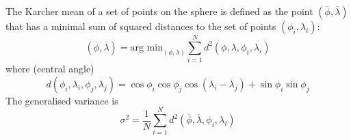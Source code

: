 \documentclass{article}
\begin{document}
The Karcher mean of a set of points on the sphere
\citep{Karc77riem,HeoSmal06form} is defined as the point
$(\overline{\phi}, \overline{\lambda})$ that has a minimal sum of
squared distances to the set of points $(\phi_i, \lambda_i)$:
\begin{equation}
  \label{fold-sphere:eq:6}
  (\overline{\phi}, \overline{\lambda}) = \mbox{arg min}_{(\phi,
    \lambda)} \sum_{i=1}^N d^2(\phi, \lambda, \phi_i, \lambda_i)
\end{equation}
where (central angle)
\begin{equation}
  \label{fold-sphere:eq:7}
  d(\phi_i, \lambda_i, \phi_j, \lambda_j) = \cos\phi_i\cos\phi_j\cos(\lambda_i-\lambda_j) + \sin\phi_i\sin\phi_j  
\end{equation}
The generalised variance is
\begin{equation}
  \label{fold-sphere:eq:8}
  \sigma^2 = \frac{1}{N} \sum_{i=1}^N d^2(\overline{\phi}, \overline{\lambda}, \phi_i, \lambda_i)
\end{equation}



\end{document}
